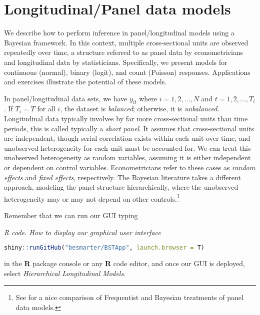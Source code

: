 \chapter{Longitudinal/Panel data models}\label{chap9}

We describe how to perform inference in panel/longitudinal models using a Bayesian framework. In this context, multiple cross-sectional units are observed repeatedly over time, a structure referred to as panel data by econometricians and longitudinal data by statisticians. Specifically, we present models for continuous (normal), binary (logit), and count (Poisson) responses. Applications and exercises illustrate the potential of these models.

In panel/longitudinal data sets, we have $y_{it}$ where $i=1,2,\dots,N$ and $t=1,2,\dots,T_i$. If $T_i=T$ for all $i$, the dataset is \textit{balanced}; otherwise, it is \textit{unbalanced}. Longitudinal data typically involves by far more cross-sectional units than time periods, this is called typically a \textit{short panel}. It assumes that cross-sectional units are independent, though serial correlation exists within each unit over time, and unobserved heterogeneity for each unit must be accounted for. We can treat this unobserved heterogeneity as random variables, assuming it is either independent or dependent on control variables. Econometricians refer to these cases as \textit{random effects} and \textit{fixed effects}, respectively. The Bayesian literature takes a different approach, modeling the panel structure hierarchically, where the unobserved heterogeneity may or may not depend on other controls.\footnote{See \cite{rendon2013fixed} for a nice comparison of Frequentist and Bayesian treatments of panel data models.}

Remember that we can run our GUI typing

\begin{tcolorbox}[enhanced,width=4.67in,center upper,
	fontupper=\large\bfseries,drop shadow southwest,sharp corners]
	\textit{R code. How to display our graphical user interface}
	\begin{VF}
	\begin{lstlisting}[language=R]
	shiny::runGitHub("besmarter/BSTApp", launch.browser = T)\end{lstlisting}
	\end{VF}
\end{tcolorbox} 

in the \textbf{R} package console or any \textbf{R} code editor, and once our GUI is deployed, select \textit{Hierarchical Longitudinal Models}.



